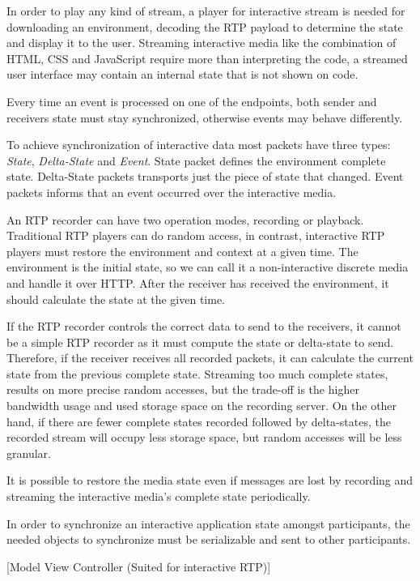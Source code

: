 	In order to play any kind of stream, a player for interactive stream is needed for downloading an environment, decoding the \ac{RTP} payload to determine the state and display it to the user. Streaming interactive media like the combination of \ac{HTML}, \ac{CSS} and JavaScript require more than interpreting the code, a streamed user interface may contain an internal state that is not shown on code.

	Every time an event is processed on one of the endpoints, both sender and receivers state must stay synchronized, otherwise events may behave differently.

	To achieve synchronization of interactive data most packets have three types: \textit{State}, \textit{Delta-State} and \textit{Event}. State packet defines the environment complete state. Delta-State packets transports just the piece of state that changed. Event packets informs that an event occurred over the interactive media. 


	An \ac{RTP} recorder can have two operation modes, recording or playback. Traditional \ac{RTP} players can do random access, in contrast, interactive \ac{RTP} players must restore the environment and context at a given time. The environment is the initial state, so we can call it a non-interactive discrete media and handle it over \ac{HTTP}. After the receiver has received the environment, it should calculate the state at the given time. 

	If the \ac{RTP} recorder controls the correct data to send to the receivers, it cannot be a simple \ac{RTP} recorder as it must compute the state or delta-state to send. Therefore, if the receiver receives all recorded packets, it can calculate the current state from the previous complete state. Streaming too much complete states, results on more precise random accesses, but the trade-off is the higher bandwidth usage and used storage space on the recording server. On the other hand, if there are fewer complete states recorded followed by delta-states, the recorded stream will occupy less storage space, but random accesses will be less granular.

	It is possible to restore the media state even if messages are lost by recording and streaming the interactive media's complete state periodically.

	In order to synchronize an interactive application state amongst participants, the needed objects to synchronize must be serializable and sent to other participants.

  {\color{fade}[Model View Controller (Suited for interactive RTP)]}

